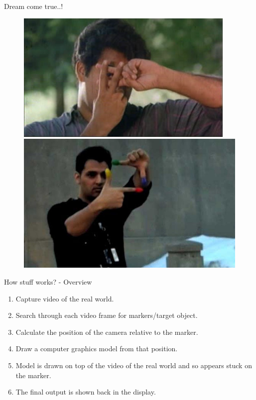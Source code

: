 \documentclass{beamer}
\begin{document}
\begin{frame}{Dream come true..!}
	\begin{figure}
	    \includegraphics[scale=.3878]{mohanlal.png}
	    \pause \includegraphics[scale=.20]{pranavclick.jpg}
	\end{figure}
\end{frame}


\begin{frame}{How stuff works? - Overview}
	\begin{enumerate}
		\item Capture video of the real world.
		\item Search through each video frame for markers/target object.
		\item Calculate the position of the camera relative to the marker.
		\item Draw a  computer graphics model from that position.
		\item Model is drawn on top of the video of the real world and so appears stuck on the marker.
		\item The final output is shown back in the display.
	\end{enumerate}
\end{frame}
\end{document}
